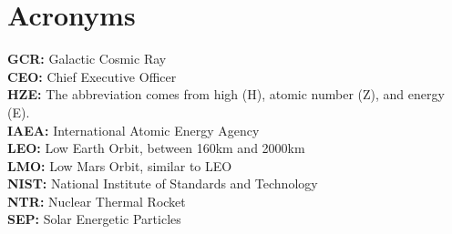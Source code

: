 \chapter*{Acronyms}

\textbf{GCR: } Galactic Cosmic Ray\\
\textbf{CEO: } Chief Executive Officer\\
\textbf{HZE: } The abbreviation comes from high (H), atomic number (Z), and energy (E).\\
\textbf{IAEA: } International Atomic Energy Agency\\
\textbf{LEO: } Low Earth Orbit, between 160km and 2000km\\
\textbf{LMO: } Low Mars Orbit, similar to LEO\\
\textbf{NIST: } National Institute of Standards and Technology\\
\textbf{NTR: } Nuclear Thermal Rocket\\
\textbf{SEP: } Solar Energetic Particles\\


\newpage
